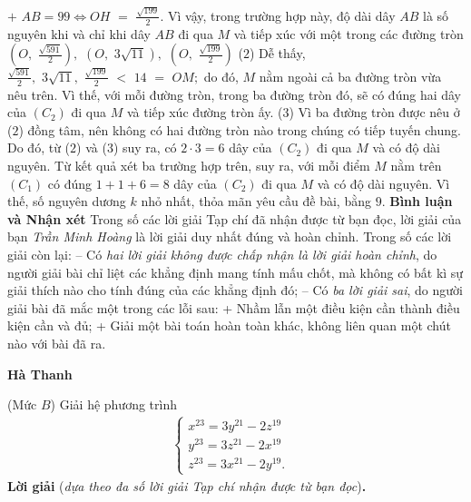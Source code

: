 \begin{multicols}{2}
	\vskip 0.05cm
	$+$ $AB = 99  \Leftrightarrow  OH\,\, = \,\,\frac{{\sqrt {199} }}{2}$.
	\vskip 0.05cm
	Vì vậy, trong trường hợp này, độ dài dây $AB$ là số nguyên khi và chỉ khi dây $AB$ đi qua $M$ và tiếp xúc với một trong các đường tròn $\left( {O,\,\,\frac{{\sqrt {591} }}{2}} \right),$    $\left( {O,\,\,3\sqrt {11} } \right),$      $\left( {O,\,\,\frac{{\sqrt {199} }}{2}}\right)$ \hfill ($2$)
	\vskip 0.05cm
	Dễ thấy, $\frac{{\sqrt {591} }}{2},\,\,3\sqrt {11} ,\,\,\frac{{\sqrt {199} }}{2}\,\, < \,\,14\,\, = \,\,OM;$  do đó, $M$ nằm ngoài cả ba đường tròn vừa nêu trên. Vì thế, với mỗi đường tròn, trong ba đường tròn đó, sẽ có đúng hai dây của  $(C_2)$ đi qua $M$ và tiếp xúc đường tròn ấy.                  \hfill ($3$)
	\vskip 0.05cm
	Vì ba đường tròn được nêu ở ($2$) đồng tâm, nên không có hai đường tròn nào trong chúng có tiếp tuyến chung. Do đó, từ ($2$) và ($3$) suy ra, có $2 \cdot 3 = 6$  dây của  $(C_2)$ đi qua $M$ và có độ dài nguyên.
	\vskip 0.05cm
	Từ kết quả xét ba trường hợp trên, suy ra, với mỗi điểm $M$ nằm trên $(C_1)$  có đúng $1 + 1 + 6 = 8$ dây của $(C_2)$  đi qua $M$ và có độ dài nguyên. Vì thế, số nguyên dương $k$ nhỏ nhất, thỏa mãn yêu cầu đề bài, bằng $9$.
	\vskip 0.05cm
	\textbf{Bình luận và Nhận xét}
	\vskip 0.05cm
	Trong số các lời giải Tạp chí đã nhận được từ bạn đọc, lời giải của bạn \textit{Trần Minh Hoàng} là lời giải duy nhất đúng và hoàn chỉnh. Trong số các lời giải còn lại:
	\vskip 0.05cm
	-- Có \textit{hai lời giải không được chấp nhận là lời giải hoàn chỉnh}, do người giải bài chỉ liệt các khẳng định mang tính mấu chốt, mà không có bất kì sự giải thích nào cho tính đúng của các khẳng định đó;
	\vskip 0.05cm
	-- Có \textit{ba lời giải sai}, do người giải bài đã mắc một trong các lỗi sau:
	\vskip 0.05cm
	+ Nhầm lẫn một điều kiện cần thành điều kiện cần và đủ;
	\vskip 0.05cm
	+ Giải một bài toán hoàn toàn khác, không liên quan một chút nào với bài đã ra.
	\begin{flushright}
		\textbf{Hà Thanh}
	\end{flushright}
	{}
	(Mức $B$) Giải hệ phương trình
	\begin{align*}
		\begin{cases}
			x^{23}=3y^{21}-2z^{19}&\\
			y^{23}=3z^{21}-2x^{19}&\\
			z^{23}=3x^{21}-2y^{19}.
		\end{cases}
	\end{align*}
	\textbf{Lời giải} (\textit{dựa theo đa số lời giải Tạp chí nhận được từ bạn đọc})\textbf{.}

\end{multicols}
